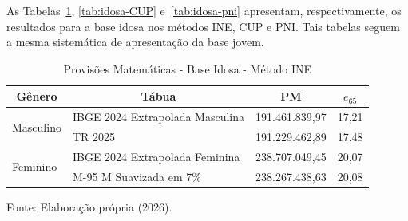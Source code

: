 As Tabelas~\ref{tab:idosa-ine}, \ref{tab:idosa-CUP} e~\ref{tab:idosa-pni} apresentam, respectivamente, os resultados para a base idosa nos métodos INE, CUP e PNI. Tais tabelas seguem a mesma sistemática de apresentação da base jovem.
\vspace{0.25cm}
\begin{table}[htbp]
    \centering
    \caption{Provisões Matemáticas - Base Idosa - Método INE}
    \begin{threeparttable}
    \renewcommand{\arraystretch}{1.0}
    \begin{tabular}{llrr}
    \toprule
    \multicolumn{1}{c}{\textbf{Gênero}} & \multicolumn{1}{c}{\textbf{Tábua}} & \multicolumn{1}{c}{\textbf{PM}} & \multicolumn{1}{c}{\textbf{$e_{65}$}} \\ \midrule
    \multirow{2}{*}{Masculino} & IBGE 2024 Extrapolada Masculina & 191.461.839,97 & 17,21 \\
                                & TR 2025 & 191.229.462,89 & 17.48 \\ \hline
    \multirow{2}{*}{Feminino} & IBGE 2024 Extrapolada Feminina & 238.707.049,45 & 20,07 \\
                                & M-95 M Suavizada em 7\% & 238.267.438,63 & 20,08 \\ \bottomrule
    \end{tabular}
    \begin{tablenotes}[flushleft]
        \small
        \item Fonte: Elaboração própria (2026).
    \end{tablenotes}
    \end{threeparttable}
    \label{tab:idosa-ine}
\end{table}
\vspace{0.25cm}
